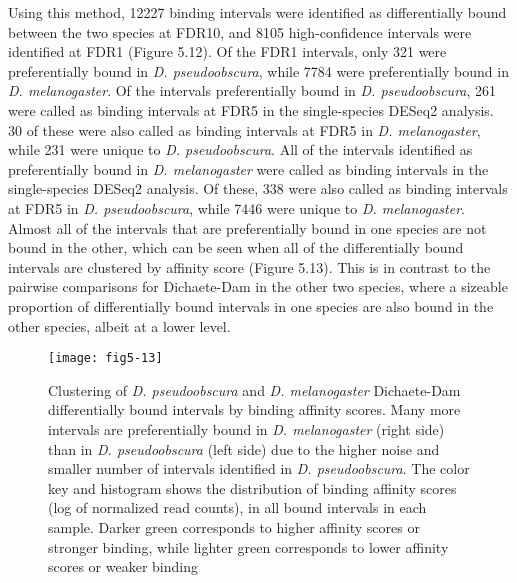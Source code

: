 Using this method, 12227 binding intervals were identified as differentially bound between the two species at FDR10, and 8105 high-confidence intervals were identified at FDR1 (Figure 5.12). Of the FDR1 intervals, only 321 were preferentially bound in \emph{D. pseudoobscura}, while 7784 were preferentially bound in \emph{D. melanogaster}. Of the intervals preferentially bound in \emph{D. pseudoobscura}, 261 were called as binding intervals at FDR5 in the single-species DESeq2 analysis. 30 of these were also called as binding intervals at FDR5 in \emph{D. melanogaster}, while 231 were unique to \emph{D. pseudoobscura}. All of the intervals identified as preferentially bound in \emph{D. melanogaster} were called as binding intervals in the single-species DESeq2 analysis. Of these, 338 were also called as binding intervals at FDR5 in \emph{D. pseudoobscura}, while 7446 were unique to \emph{D. melanogaster}. Almost all of the intervals that are preferentially bound in one species are not bound in the other, which can be seen when all of the differentially bound intervals are clustered by affinity score (Figure 5.13). This is in contrast to the pairwise comparisons for Dichaete-Dam in the other two species, where a sizeable proportion of differentially bound intervals in one species are also bound in the other species, albeit at a lower level.

\begin{figure}
\centering
\texttt{[image: fig5-13]}
\caption{Clustering of \emph{D. pseudoobscura} and \emph{D. melanogaster} Dichaete-Dam differentially bound intervals by binding affinity scores. Many more intervals are preferentially bound in \emph{D. melanogaster} (right side) than in \emph{D. pseudoobscura} (left side) due to the higher noise and smaller number of intervals identified in \emph{D. pseudoobscura}. The color key and histogram shows the distribution of binding affinity scores (log of normalized read counts), in all bound intervals in each sample. Darker green corresponds to higher affinity scores or stronger binding, while lighter green corresponds to lower affinity scores or weaker binding}
\label{Figure 5.13}
\end{figure}

